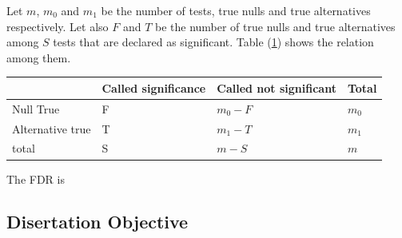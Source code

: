 Let $m$,  $m_0$  and $m_1$ be the number of tests,  true nulls  and true alternatives respectively.
Let also $F$ and $T$ be the number of true nulls and true alternatives among $S$ tests that are
declared as significant. Table (\ref{table1}) shows the  relation among them. 
\begin{table}[h]\label{table1}\begin{center}
		\begin{tabular}{llll}
			& Called significance & Called not significant & Total  \\ \hline
			Null True &F &$m_0-F$  & $m_0$  \\
			Alternative true & T  & $m_1 -T$  & $m_1$  \\
			total & S & $m-S$  & $m$ \\ \hline
		\end{tabular}\end{center}
	\end{table} 
	The FDR is 
	
	\subsection{Disertation Objective}
	
	
	
	

